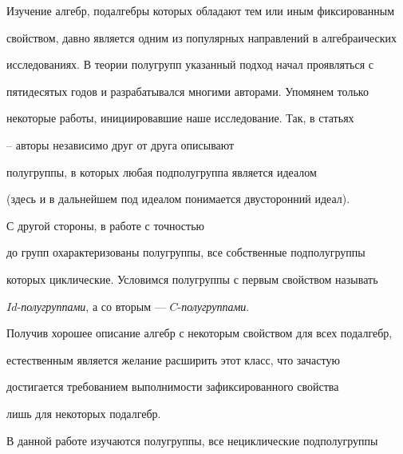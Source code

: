 \pagestyle{plain} %













\maketitle


\label{begin}





Изучение алгебр, подалгебры которых обладают тем или иным фиксированным


свойством, давно является одним из популярных направлений в алгебраических


исследованиях. В теории полугрупп указанный подход начал проявляться с


пятидесятых годов и разрабатывался многими авторами. Упомянем только


некоторые работы, инициировавшие наше исследование. Так, в статьях


\cite{1}--\cite{3} авторы независимо друг от друга описывают


полугруппы, в которых любая подполугруппа является идеалом


(здесь и в дальнейшем под идеалом понимается двусторонний идеал).


С другой стороны, в работе \cite{4} с точностью


до групп охарактеризованы полугруппы, все собственные подполугруппы


которых циклические. Условимся полугруппы с первым свойством называть


$Id$-{\it полугруппами}, а со вторым --- $C$-{\it полугруппами}.


Получив хорошее описание алгебр с некоторым свойством для всех подалгебр,


естественным является желание расширить этот класс, что зачастую


достигается требованием выполнимости зафиксированного свойства


лишь для некоторых подалгебр.





В данной работе изучаются полугруппы, все нециклические подполугруппы


